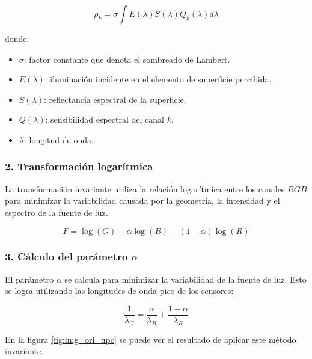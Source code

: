 $$\rho_k =\sigma \int E(\lambda )S(\lambda )Q_k (\lambda )d\lambda$$

donde:

\begin{itemize}
\setlength{\itemsep}{-1ex}
   \item{\begin{flushleft} $\sigma$: factor constante que denota el sombreado de Lambert. \end{flushleft}}
   \item{\begin{flushleft} $E(\lambda )$: iluminación incidente en el elemento de superficie percibida. \end{flushleft}}
   \item{\begin{flushleft} $S(\lambda )$: reflectancia espectral de la superficie. \end{flushleft}}
   \item{\begin{flushleft} $Q(\lambda )$: sensibilidad espectral del canal $k$. \end{flushleft}}
   \item{\begin{flushleft} $\lambda$: longitud de onda. \end{flushleft}}
\end{itemize}

\subsubsection{2. Transformación logarítmica}

La transformación invariante utiliza la relación logarítmica entre los canales $RGB$ para minimizar la variabilidad causada por la geometría, la intensidad y el espectro de la fuente de luz.

$$F=\log (G)-\alpha \log (B)-(1-\alpha )\log (R)$$

\subsubsection{3. Cálculo del parámetro $\alpha$}

El parámetro $\alpha$ se calcula para minimizar la variabilidad de la fuente de luz. Esto se logra utilizando las longitudes de onda pico de los sensores:

$$\frac{1}{\lambda_G }=\frac{\alpha }{\lambda_B }+\frac{1-\alpha }{\lambda_R }$$

En la figura \ref{fig:img_ori_upc} se puede ver el resultado de aplicar este método invariante.

